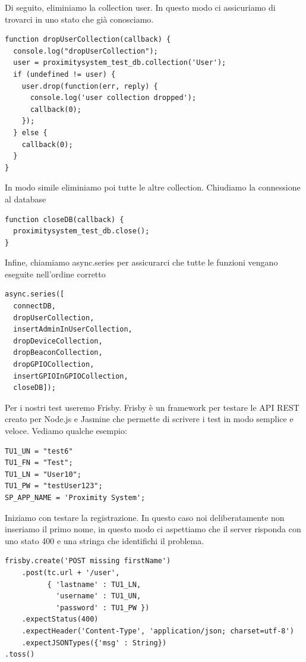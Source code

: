 Di seguito, eliminiamo la collection user. 
In questo modo ci assicuriamo di trovarci in uno stato che già conosciamo.

\begin{lstlisting}[caption={test/config/setup\_tests.js - dropUserCollection}, style=javaScriptCode]
function dropUserCollection(callback) {
  console.log("dropUserCollection");
  user = proximitysystem_test_db.collection('User');
  if (undefined != user) {
    user.drop(function(err, reply) {
      console.log('user collection dropped');
      callback(0);
    });
  } else {
    callback(0);
  }
}
\end{lstlisting}

In modo simile eliminiamo poi tutte le altre collection.
Chiudiamo la connessione al database

\begin{lstlisting}[caption={test/config/setup\_tests.js - closeDB}, style=javaScriptCode]
function closeDB(callback) {
  proximitysystem_test_db.close();
}
\end{lstlisting}

Infine, chiamiamo async.series per assicurarci che tutte le funzioni vengano eseguite nell’ordine corretto

\begin{lstlisting}[caption={test/config/setup\_tests.js - async}, style=javaScriptCode]
async.series([
  connectDB,
  dropUserCollection,
  insertAdminInUserCollection,
  dropDeviceCollection,
  dropBeaconCollection,
  dropGPIOCollection,
  insertGPIOInGPIOCollection,
  closeDB]);
\end{lstlisting}

Per i nostri test useremo Frisby.
Frisby è un framework per testare le API REST creato per Node.js e Jasmine che permette di scrivere i test in modo semplice e veloce.
Vediamo qualche esempio:

\begin{lstlisting}[caption={test/user/create\_accounts\_error\_spec.js}, style=javaScriptCode]
TU1_UN = "test6"
TU1_FN = "Test";
TU1_LN = "User10";
TU1_PW = "testUser123";
SP_APP_NAME = 'Proximity System';
\end{lstlisting}

Iniziamo con testare la registrazione. 
In questo caso noi deliberatamente non inseriamo il primo nome, in questo modo ci aspettiamo che il server risponda con uno stato 400 
e una stringa che identifichi il problema.

\begin{lstlisting}[caption={test/user/create\_accounts\_error\_spec.js}, style=javaScriptCode]
frisby.create('POST missing firstName')
    .post(tc.url + '/user',
          { 'lastname' : TU1_LN,
            'username' : TU1_UN,
            'password' : TU1_PW })
    .expectStatus(400)
    .expectHeader('Content-Type', 'application/json; charset=utf-8')
    .expectJSONTypes({'msg' : String})
.toss()
\end{lstlisting}

